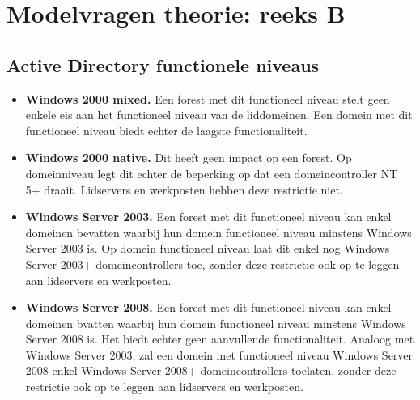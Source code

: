 \documentclass{report}
\begin{document}
	\chapter{Modelvragen theorie: reeks B}
	\section{Active Directory functionele niveaus }
	\begin{enumerate}
		 {
			\begin{itemize}
				\item \textbf{Windows 2000 mixed.} Een forest met dit functioneel niveau stelt geen enkele eis aan het functioneel niveau van de liddomeinen. Een domein met dit functioneel niveau biedt echter de laagste functionaliteit. 
				\item \textbf{Windows 2000 native.} Dit heeft geen impact op een forest. Op domeinniveau legt dit echter de beperking op dat een domeincontroller NT 5+ draait. Lidservers en werkposten hebben deze restrictie niet.
				\item \textbf{Windows Server 2003.} Een forest met dit functioneel niveau kan enkel domeinen bevatten waarbij hun domein functioneel niveau minstens Windows Server 2003 is. Op domein functioneel niveau laat dit enkel nog Windows Server 2003+ domeincontrollers toe, zonder deze restrictie ook op te leggen aan lidservers en werkposten. 
				\item \textbf{Windows Server 2008.} Een forest met dit functioneel niveau kan enkel domeinen bvatten waarbij hun domein functioneel niveau minstens Windows Server 2008 is. Het biedt echter geen aanvullende functionaliteit. Analoog met Windows Server 2003, zal een domein met functioneel niveau Windows Server 2008 enkel Windows Server 2008+ domeincontrollers toelaten, zonder deze restrictie ook op te leggen aan lidservers en werkposten. 
			\end{itemize}
			
}
\end{enumerate}
\end{document}
